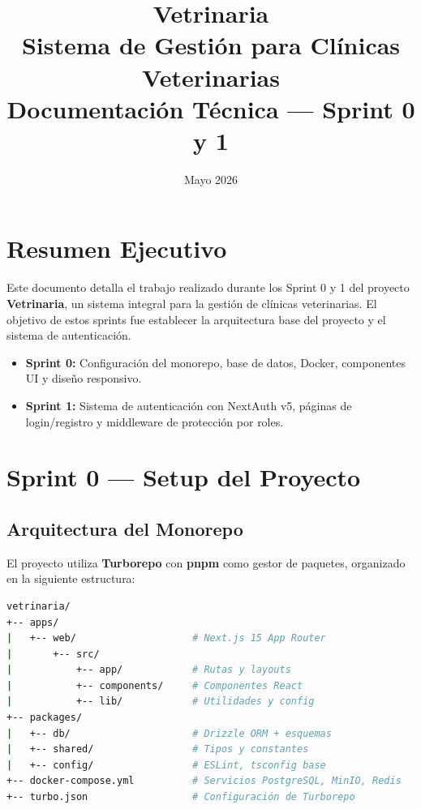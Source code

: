 \documentclass[12pt,a4paper]{article}
\title{\vspace{-2cm}\textbf{Vetrinaria}\\[0.3cm]
\large Sistema de Gestión para Clínicas Veterinarias\\[0.5cm]
\textbf{Documentación Técnica — Sprint 0 y 1}}
\author{}
\date{Mayo 2026}
\begin{document}
\maketitle
\thispagestyle{empty}
\newpage

\tableofcontents
\newpage

\section{Resumen Ejecutivo}

Este documento detalla el trabajo realizado durante los Sprint 0 y 1 del proyecto
\textbf{Vetrinaria}, un sistema integral para la gestión de clínicas veterinarias.
El objetivo de estos sprints fue establecer la arquitectura base del proyecto y el
sistema de autenticación.

\begin{itemize}[leftmargin=*]
    \item \textbf{Sprint 0:} Configuración del monorepo, base de datos, Docker,
          componentes UI y diseño responsivo.
    \item \textbf{Sprint 1:} Sistema de autenticación con NextAuth v5, páginas de
          login/registro y middleware de protección por roles.
\end{itemize}

\section{Sprint 0 — Setup del Proyecto}

\subsection{Arquitectura del Monorepo}

El proyecto utiliza \textbf{Turborepo} con \textbf{pnpm} como gestor de paquetes,
organizado en la siguiente estructura:

\begin{lstlisting}[language=bash, caption=Estructura del monorepo]
vetrinaria/
+-- apps/
|   +-- web/                    # Next.js 15 App Router
|       +-- src/
|           +-- app/            # Rutas y layouts
|           +-- components/     # Componentes React
|           +-- lib/            # Utilidades y config
+-- packages/
|   +-- db/                     # Drizzle ORM + esquemas
|   +-- shared/                 # Tipos y constantes
|   +-- config/                 # ESLint, tsconfig base
+-- docker-compose.yml          # Servicios PostgreSQL, MinIO, Redis
+-- turbo.json                  # Configuración de Turborepo
\end{lstlisting}
\end{document}
